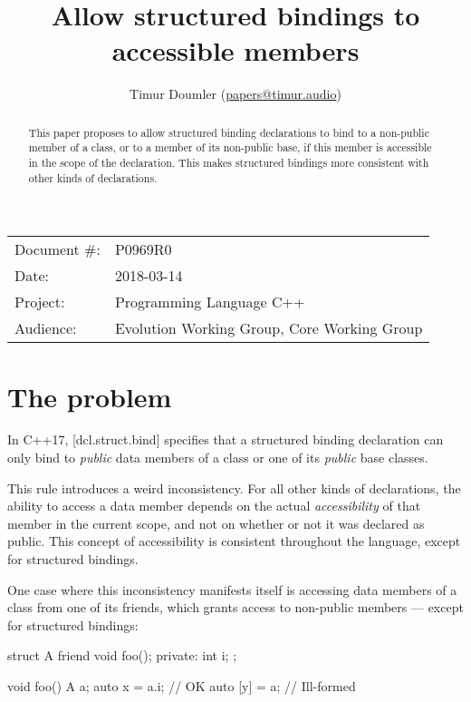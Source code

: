 


\title{Allow structured bindings to accessible members}
\author{ Timur Doumler \small(\href{mailto:papers@timur.audio}{papers@timur.audio}) }
\date{}
\maketitle

\begin{tabular}{ll}
Document \#: & P0969R0 \\
Date: &2018-03-14 \\
Project: & Programming Language C++ \\
Audience: & Evolution Working Group, Core Working Group
\end{tabular}

\begin{abstract}
This paper proposes to allow structured binding declarations to bind to a non-public member of a class, or to a member of its non-public base, if this member is accessible in the scope of the declaration. This makes structured bindings more consistent with other kinds of declarations.
\end{abstract}

\section{The problem}

In C++17, [dcl.struct.bind] specifies that a structured binding declaration can only bind to \emph{public} data members of a class or one of its \emph{public} base classes.

This rule introduces a weird inconsistency. For all other kinds of declarations, the ability to access a data member depends on the actual \emph{accessibility} of that member in the current scope, and not on whether or not it was declared as public.  This concept of accessibility is consistent throughout the language, except for structured bindings.

One case where this inconsistency manifests itself is accessing data members of a class from one of its friends, which grants access to non-public members --- except for structured bindings:

\begin{codeblock}
struct A {
   friend void foo();
private:
   int i;
};

void foo() {
   A a;
   auto x = a.i;  // OK
   auto [y] = a;  // Ill-formed
}
\end{codeblock}

